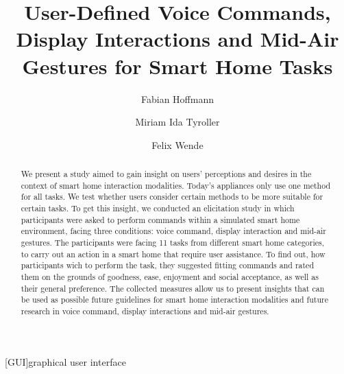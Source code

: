 \documentclass[sigchi]{acmart}
\begin{document}
	\begin{acronym}
	[GUI]{graphical user interface}
	\end{acronym}
	
	\title{User-Defined Voice Commands, Display Interactions and Mid-Air Gestures for Smart Home Tasks}
	
	\author{Fabian Hoffmann}
	
	\author{Miriam Ida Tyroller}
	
	\author{Felix Wende}
	
	
	\begin{abstract}
		We present a study aimed to gain insight on users' perceptions and desires in the context of smart home interaction modalities. Today's appliances only use one method for all tasks. We test whether users consider certain methods to be more suitable for certain tasks. To get this insight, we conducted an elicitation study in which participants were asked to perform commands within a simulated smart home environment, facing three conditions: voice command, display interaction and mid-air gestures. The participants were facing 11 tasks from different smart home categories, to carry out an action in a smart home that require user assistance. To find out, how participants wich to perform the task, they suggested fitting commands and rated them on the grounds of goodness, ease, enjoyment and social acceptance, as well as their general preference. The collected measures allow us to present insights that can be used as possible future guidelines for smart home interaction modalities and future research in voice command, display interactions and mid-air gestures.
	\end{abstract}
	
\end{document}
